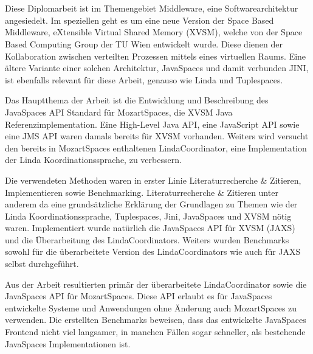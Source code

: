 
%
\section*{\thesisheading} %


Diese Diplomarbeit ist im Themengebiet Middleware, eine Softwarearchitektur angesiedelt. Im speziellen geht es um eine neue Version der Space Based Middleware, eXtensible Virtual Shared Memory (XVSM), welche von der Space Based Computing Group der TU Wien entwickelt wurde. Diese dienen der Kollaboration zwischen verteilten Prozessen mittels eines virtuellen Raums. Eine ältere Variante einer solchen Architektur, JavaSpaces und damit verbunden JINI, ist ebenfalls relevant für diese Arbeit, genauso wie Linda und Tuplespaces.\cite[Kap.~1,2]{Keszthelyi2008}

Das Hauptthema der Arbeit ist die Entwicklung und Beschreibung des JavaSpaces API Standard für MozartSpaces, die XVSM Java Referenzimplementation. Eine High-Level Java API, eine JavaScript API sowie eine JMS API waren damals bereits für XVSM vorhanden. Weiters wird versucht den bereits in MozartSpaces enthaltenen LindaCoordinator, eine Implementation der Linda Koordinationssprache, zu verbessern.\cite[Kap.~6,7]{Keszthelyi2008}
 
Die verwendeten Methoden waren in erster Linie Literaturrecherche \& Zitieren, Implementieren sowie Benchmarking. Literaturrecherche \& Zitieren unter anderem da eine grundsätzliche Erklärung der Grundlagen zu Themen wie der Linda Koordinationssprache, Tuplespaces, Jini, JavaSpaces und XVSM nötig waren. Implementiert wurde natürlich die JavaSpaces API für XVSM (JAXS) und die Überarbeitung des LindaCoordinators. Weiters wurden Benchmarks sowohl für die überarbeitete Version des LindaCoordinators wie auch für JAXS selbst durchgeführt.\cite[Kap.~6,7,8]{Keszthelyi2008}

Aus der Arbeit resultierten primär der überarbeitete LindaCoordinator sowie die JavaSpaces API für MozartSpaces. Diese API erlaubt es für JavaSpaces entwickelte Systeme und Anwendungen ohne Änderung auch MozartSpaces zu verwenden. Die erstellten Benchmarks beweisen, dass das entwickelte JavaSpaces Frontend nicht viel langsamer, in manchen Fällen sogar schneller, als bestehende JavaSpaces Implementationen ist.\cite[Kap.~9]{Keszthelyi2008}

